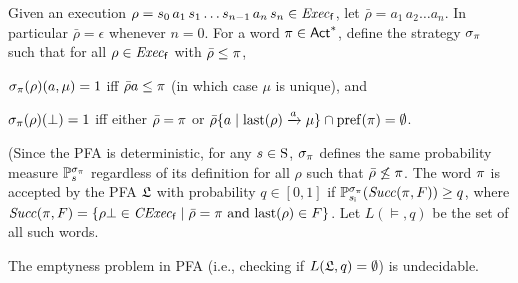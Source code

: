 Given an execution
$\rho = s_0\,a_1\,s_1\ldots s_{n-1}\,a_n\,s_n \in \execf$,
let $\bar{\rho} = a_1\, a_2\ldots a_n$.  In particular
$\bar{\rho} = \epsilon$ whenever $n=0$.
%
For a word $\plan\in\Act^*$, define the strategy $\strat_\plan$ such
that for all $\rho\in\execf$ with $\bar{\rho}\leq\plan$,
%
\begin{enumerate*}[(i)]
\item%
  $\strat_\plan(\rho)(a,\mu)=1$ iff $\bar{\rho}a\leq\plan$ (in which
  case $\mu$ is unique), and
\item%
  $\strat_\plan(\rho)(\complete)=1$ iff either $\bar{\rho}=\plan$ or
  $\bar{\rho}\{a\mid{\last(\rho)\reach{a}\mu}\}\cap\pref(\plan) = \emptyset$.
\end{enumerate*}
%
(Since the PFA is deterministic, for any $s\in\S$, $\strat_\plan$
defines the same probability measure $\Prob_s^{\strat_\plan}$
regardless of its definition for all $\rho$ such that
$\bar{\rho}\not\leq\plan$.
%
The word $\plan$ is accepted by the PFA $\model$ with probability
$q\in[0,1]$ if $\Prob_{s_{\textsf{i}}}^{\strat_\plan}(\Succ(\plan,F))\geq q$, where
$\Succ(\plan,F)=\{{\rho\complete\in\cexecf}\mid{\bar{\rho}=\plan \text{ and } \last(\rho)\in F}\}$.
%
Let $L(\models,q)$ be the set of all such words.

\begin{proposition}{\cite{MadaniHC99}}\label{prop:empty:PFA:undecidable}
  The emptyness problem in PFA (i.e., checking if
  $L(\model,q)=\emptyset$) is undecidable.
\end{proposition}


